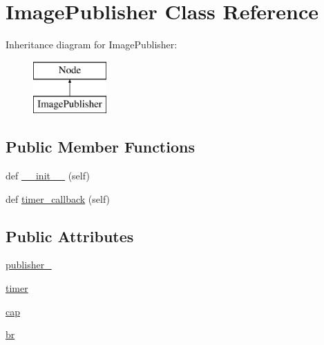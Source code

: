 \hypertarget{classtoxic__vision_1_1webcam__pub_1_1ImagePublisher}{}\section{Image\+Publisher Class Reference}
\label{classtoxic__vision_1_1webcam__pub_1_1ImagePublisher}
Inheritance diagram for Image\+Publisher\+:\begin{figure}[H]
\begin{center}
\leavevmode
\includegraphics[height=2.000000cm]{d2/da6/classtoxic__vision_1_1webcam__pub_1_1ImagePublisher}
\end{center}
\end{figure}
\subsection*{Public Member Functions}
\begin{DoxyCompactItemize}
\item 
def \mbox{\hyperlink{classtoxic__vision_1_1webcam__pub_1_1ImagePublisher_ae64f0875afe3067b97ba370b354b9213}{\+\_\+\+\_\+init\+\_\+\+\_\+}} (self)
\item 
def \mbox{\hyperlink{classtoxic__vision_1_1webcam__pub_1_1ImagePublisher_a9692d7a212fa89bc61dacc687e826097}{timer\+\_\+callback}} (self)
\end{DoxyCompactItemize}
\subsection*{Public Attributes}
\begin{DoxyCompactItemize}
\item 
\mbox{\hyperlink{classtoxic__vision_1_1webcam__pub_1_1ImagePublisher_a2ab19359a5607f32a7b39d6d9f61c3b5}{publisher\+\_\+}}
\item 
\mbox{\hyperlink{classtoxic__vision_1_1webcam__pub_1_1ImagePublisher_a9fabcf6aa0647a2414f7cb1a2ab2634a}{timer}}
\item 
\mbox{\hyperlink{classtoxic__vision_1_1webcam__pub_1_1ImagePublisher_a9499a5c7f196d66c6afe0222bd5a9219}{cap}}
\item 
\mbox{\hyperlink{classtoxic__vision_1_1webcam__pub_1_1ImagePublisher_a88f0860257ba6bdc089557444f5cdd16}{br}}
\end{DoxyCompactItemize}


